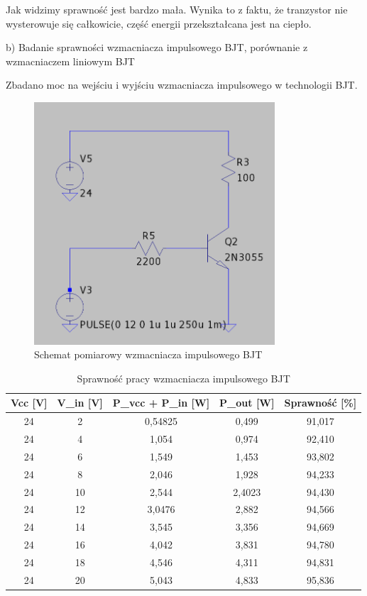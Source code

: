 \documentclass[11pt]{article}
\begin{document}
Jak widzimy sprawność jest bardzo mała. Wynika to z faktu, że tranzystor nie wysterowuje się całkowicie,
część energii przekształcana jest na ciepło.

b) Badanie sprawności wzmacniacza impulsowego BJT, porównanie z wzmacniaczem liniowym BJT

Zbadano moc na wejściu i wyjściu wzmacniacza impulsowego w technologii BJT.\\

\begin{figure}[H]
\centering
\includegraphics[width=0.8\textwidth]{aun1_impulsowy_bjt.png}
\caption{Schemat pomiarowy wzmacniacza impulsowego BJT}
\end{figure}

\begin{table}[H]
\centering
\begin{tabular}{|c|c|c|c|c|}
\hline
\textbf{Vcc [V]} & \textbf{V\_in [V]} & \textbf{P\_vcc + P\_in [W]} & \textbf{P\_out [W]} & \textbf{Sprawność [\%]} \\
\hline
24 & 2  & 0{,}54825 & 0{,}499   & 91{,}017 \\
\hline
24 & 4  & 1{,}054   & 0{,}974   & 92{,}410 \\
\hline
24 & 6  & 1{,}549   & 1{,}453   & 93{,}802 \\
\hline
24 & 8  & 2{,}046   & 1{,}928   & 94{,}233 \\
\hline
24 & 10 & 2{,}544   & 2{,}4023  & 94{,}430 \\
\hline
24 & 12 & 3{,}0476  & 2{,}882   & 94{,}566 \\
\hline
24 & 14 & 3{,}545   & 3{,}356   & 94{,}669 \\
\hline
24 & 16 & 4{,}042   & 3{,}831   & 94{,}780 \\
\hline
24 & 18 & 4{,}546   & 4{,}311   & 94{,}831 \\
\hline
24 & 20 & 5{,}043   & 4{,}833   & 95{,}836 \\
\hline
\end{tabular}
\caption{Sprawność pracy wzmacniacza impulsowego BJT}
\end{table}
\end{document}

